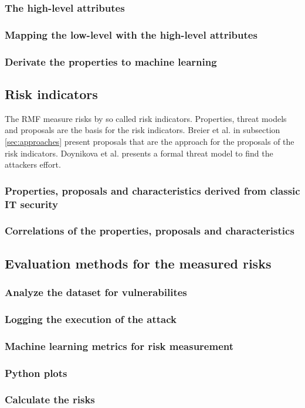 \subsubsection*{The high-level attributes}


\subsubsection*{Mapping the low-level with the high-level attributes}


\subsubsection*{Derivate the properties to machine learning}


\subsection{Risk indicators}
\label{sec:risk_indicators}

The RMF measure risks by so called risk indicators. Properties, threat models and proposals are the basis for the risk indicators. Breier et al. in subsection \ref{sec:approaches} present
proposals that are the approach for the proposals of the risk indicators. Doynikova et al. presents a formal threat model to find the attackers effort.

\subsubsection*{Properties, proposals and characteristics derived from classic IT security}


\subsubsection*{Correlations of the properties, proposals and characteristics}


\subsection{Evaluation methods for the measured risks}


\subsubsection*{Analyze the dataset for vulnerabilites}


\subsubsection*{Logging the execution of the attack}


\subsubsection*{Machine learning metrics for risk measurement}


\subsubsection*{Python plots}


\subsubsection*{Calculate the risks}
